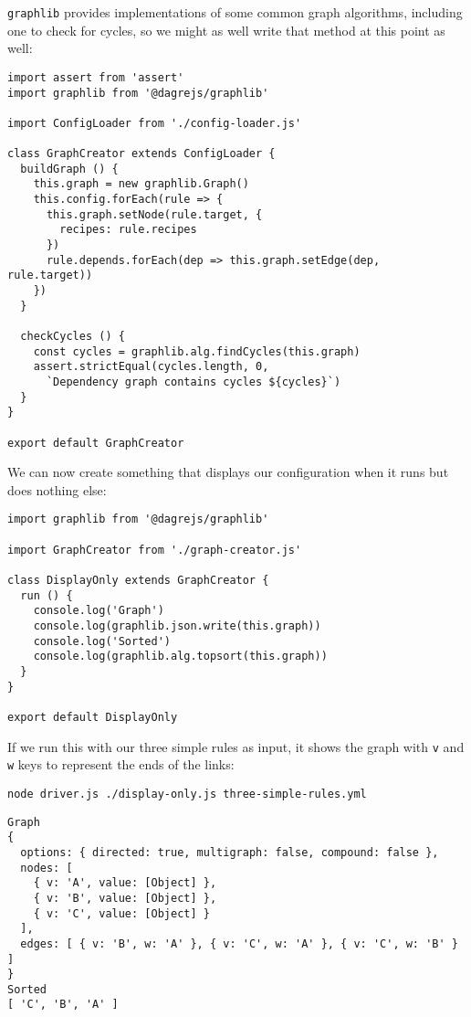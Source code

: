 \documentclass[krantzl]{krantz}
\begin{document}
\texttt{graphlib} provides implementations of some common graph algorithms,
including one to check for cycles,
so we might as well write that method at this point as well:


\begin{lstlisting}[frame=single,frameround=tttt]
import assert from 'assert'
import graphlib from '@dagrejs/graphlib'

import ConfigLoader from './config-loader.js'

class GraphCreator extends ConfigLoader {
  buildGraph () {
    this.graph = new graphlib.Graph()
    this.config.forEach(rule => {
      this.graph.setNode(rule.target, {
        recipes: rule.recipes
      })
      rule.depends.forEach(dep => this.graph.setEdge(dep, rule.target))
    })
  }

  checkCycles () {
    const cycles = graphlib.alg.findCycles(this.graph)
    assert.strictEqual(cycles.length, 0,
      `Dependency graph contains cycles ${cycles}`)
  }
}

export default GraphCreator
\end{lstlisting}



We can now create something that displays our configuration when it runs
but does nothing else:


\begin{lstlisting}[frame=single,frameround=tttt]
import graphlib from '@dagrejs/graphlib'

import GraphCreator from './graph-creator.js'

class DisplayOnly extends GraphCreator {
  run () {
    console.log('Graph')
    console.log(graphlib.json.write(this.graph))
    console.log('Sorted')
    console.log(graphlib.alg.topsort(this.graph))
  }
}

export default DisplayOnly
\end{lstlisting}



If we run this with our three simple rules as input,
it shows the graph with \texttt{v} and \texttt{w} keys to represent the ends of the links:


\begin{lstlisting}[frame=single,frameround=tttt]
node driver.js ./display-only.js three-simple-rules.yml
\end{lstlisting}



\begin{lstlisting}[frame=single,frameround=tttt]
Graph
{
  options: { directed: true, multigraph: false, compound: false },
  nodes: [
    { v: 'A', value: [Object] },
    { v: 'B', value: [Object] },
    { v: 'C', value: [Object] }
  ],
  edges: [ { v: 'B', w: 'A' }, { v: 'C', w: 'A' }, { v: 'C', w: 'B' } ]
}
Sorted
[ 'C', 'B', 'A' ]
\end{lstlisting}
\end{document}
